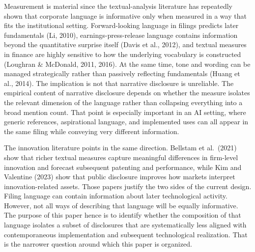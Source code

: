 Measurement is material since the textual-analysis literature has repeatedly shown that corporate language is informative only when measured in a way that fits the institutional setting. Forward-looking language in filings predicts later fundamentals (Li, 2010), earnings-press-release language contains information beyond the quantitative surprise itself (Davis et al., 2012), and textual measures in finance are highly sensitive to how the underlying vocabulary is constructed (Loughran \& McDonald, 2011, 2016). At the same time, tone and wording can be managed strategically rather than passively reflecting fundamentals (Huang et al., 2014). The implication is not that narrative disclosure is unreliable. The empirical content of narrative disclosure depends on whether the measure isolates the relevant dimension of the language rather than collapsing everything into a broad mention count. That point is especially important in an AI setting, where generic references, aspirational language, and implemented uses can all appear in the same filing while conveying very different information.

The innovation literature points in the same direction. Bellstam et al.~(2021) show that richer textual measures capture meaningful differences in firm-level innovation and forecast subsequent patenting and performance, while Kim and Valentine (2023) show that public disclosure improves how markets interpret innovation-related assets. Those papers justify the two sides of the current design. Filing language can contain information about later technological activity. However, not all ways of describing that language will be equally informative. The purpose of this paper hence is to identify whether the composition of that language isolates a subset of disclosures that are systematically less aligned with contemporaneous implementation and subsequent technological realization. That is the narrower question around which this paper is organized.